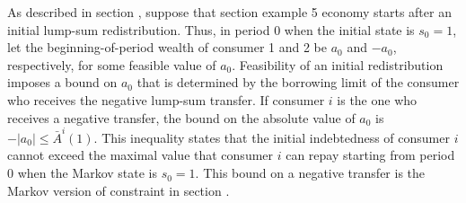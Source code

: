 As described in section , suppose that section   example 5
economy starts after an initial lump-sum redistribution.
Thus, in period $0$ when the initial state
is $s_0=1$, let the beginning-of-period wealth of 
consumer 1 and 2 be $a_0$ and $-a_0$, respectively,
for some feasible value of $a_0$. Feasibility of an initial redistribution imposes a 
bound on $a_0$ that is determined by the borrowing limit
of the consumer who receives the negative lump-sum
transfer. If consumer $i$ is the one who receives
a negative transfer, the bound on the absolute value
of $a_0$ is $-|a_0|\leq \bar A^i(1)$. This inequality states that the initial indebtedness of consumer $i$ cannot 
exceed the maximal value that consumer $i$ can repay 
starting from period $0$ when the Markov state is 
$s_0=1$. This bound on a negative transfer is the
Markov version of constraint 
in section .

